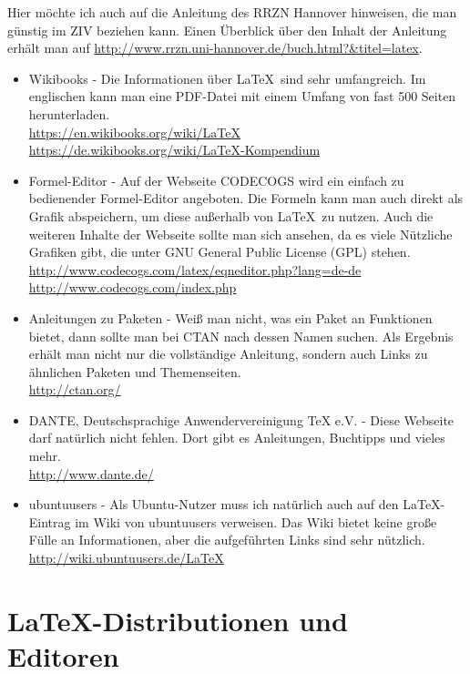 Hier möchte ich auch auf die Anleitung des RRZN Hannover hinweisen, die man günstig im ZIV beziehen kann. Einen Überblick über den Inhalt der Anleitung erhält man auf \url{http://www.rrzn.uni-hannover.de/buch.html?&titel=latex}.

\begin{itemize}
    \item Wikibooks - Die Informationen über \LaTeX\ sind sehr umfangreich. Im englischen kann man eine PDF-Datei mit einem Umfang von fast 500 Seiten herunterladen.\\
    \url{https://en.wikibooks.org/wiki/LaTeX}\\
    \url{https://de.wikibooks.org/wiki/LaTeX-Kompendium}
    \item Formel-Editor - Auf der Webseite CODECOGS wird ein einfach zu bedienender Formel-Editor angeboten. Die Formeln kann man auch direkt als Grafik abspeichern, um diese außerhalb von \LaTeX\ zu nutzen. Auch die weiteren Inhalte der Webseite sollte man sich ansehen, da es viele Nützliche Grafiken gibt,
    die unter GNU General Public License (GPL) stehen.\\
    \url{http://www.codecogs.com/latex/eqneditor.php?lang=de-de}\\
    \url{http://www.codecogs.com/index.php}
    \item Anleitungen zu Paketen - Weiß man nicht, was ein Paket an Funktionen bietet, dann sollte man bei CTAN nach dessen Namen suchen. Als Ergebnis erhält man nicht nur die vollständige Anleitung, sondern auch Links zu ähnlichen Paketen und Themenseiten.\\
    \url{http://ctan.org/}
    \item DANTE, Deutschsprachige Anwendervereinigung TeX e.V. - Diese Webseite darf natürlich nicht fehlen. Dort gibt es Anleitungen, Buchtipps und vieles mehr.\\
    \url{http://www.dante.de/}
    \item ubuntuusers - Als Ubuntu-Nutzer muss ich natürlich auch auf den \LaTeX-Eintrag im Wiki von ubuntuusers verweisen. Das Wiki bietet keine große Fülle an Informationen, aber die aufgeführten Links sind sehr nützlich.\\
    \url{http://wiki.ubuntuusers.de/LaTeX}
\end{itemize}

\section{\LaTeX-Distributionen und Editoren}

